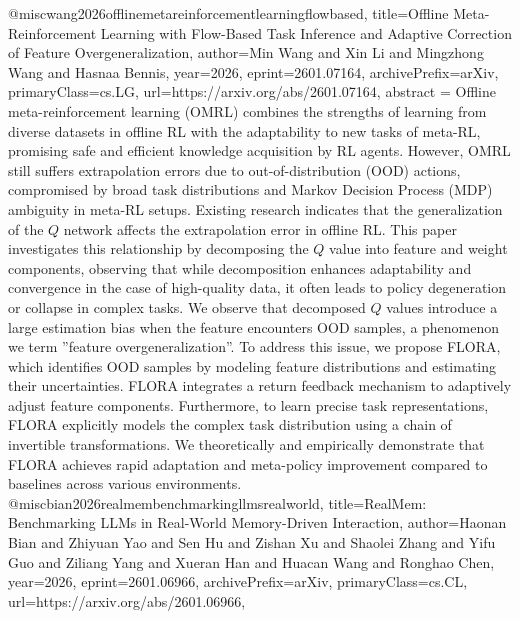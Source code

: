 {}@misc{wang2026offlinemetareinforcementlearningflowbased,
      title={Offline Meta-Reinforcement Learning with Flow-Based Task Inference and Adaptive Correction of Feature Overgeneralization}, 
      author={Min Wang and Xin Li and Mingzhong Wang and Hasnaa Bennis},
      year={2026},
      eprint={2601.07164},
      archivePrefix={arXiv},
      primaryClass={cs.LG},
      url={https://arxiv.org/abs/2601.07164},
      abstract = {Offline meta-reinforcement learning (OMRL) combines the strengths of learning from diverse datasets in offline RL with the adaptability to new tasks of meta-RL, promising safe and efficient knowledge acquisition by RL agents. However, OMRL still suffers extrapolation errors due to out-of-distribution (OOD) actions, compromised by broad task distributions and Markov Decision Process (MDP) ambiguity in meta-RL setups. Existing research indicates that the generalization of the $Q$ network affects the extrapolation error in offline RL. This paper investigates this relationship by decomposing the $Q$ value into feature and weight components, observing that while decomposition enhances adaptability and convergence in the case of high-quality data, it often leads to policy degeneration or collapse in complex tasks. We observe that decomposed $Q$ values introduce a large estimation bias when the feature encounters OOD samples, a phenomenon we term ''feature overgeneralization''. To address this issue, we propose FLORA, which identifies OOD samples by modeling feature distributions and estimating their uncertainties. FLORA integrates a return feedback mechanism to adaptively adjust feature components. Furthermore, to learn precise task representations, FLORA explicitly models the complex task distribution using a chain of invertible transformations. We theoretically and empirically demonstrate that FLORA achieves rapid adaptation and meta-policy improvement compared to baselines across various environments.}
}@misc{bian2026realmembenchmarkingllmsrealworld,
      title={RealMem: Benchmarking LLMs in Real-World Memory-Driven Interaction}, 
      author={Haonan Bian and Zhiyuan Yao and Sen Hu and Zishan Xu and Shaolei Zhang and Yifu Guo and Ziliang Yang and Xueran Han and Huacan Wang and Ronghao Chen},
      year={2026},
      eprint={2601.06966},
      archivePrefix={arXiv},
      primaryClass={cs.CL},
      url={https://arxiv.org/abs/2601.06966},
}
